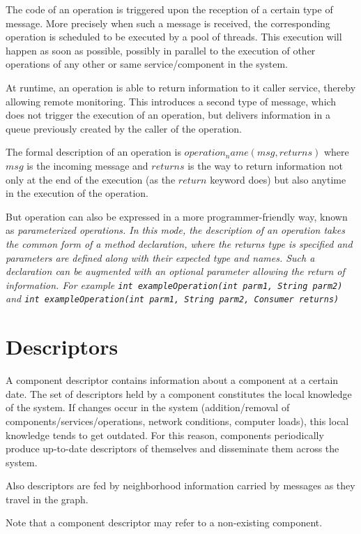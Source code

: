 \documentclass{article}
\begin{document}
The code of an operation is triggered upon the reception of a certain type of message. More precisely when such a message is received, the corresponding  operation is scheduled to be executed by a pool of threads. This execution will happen as soon as possible, possibly in parallel to the execution of other operations of any other or same service/component in the system.

At runtime, an operation is able to return information to it caller service, thereby allowing remote monitoring. This introduces a second type of message, which does not trigger the execution of an operation, but delivers information in a queue previously created by the caller of the operation.

The formal description of an operation is $operation_name(msg, returns)$ where $msg$ is the incoming message and $returns$ is the way to return information not only at the end of the execution (as the $return$ keyword does) but also anytime in the execution of the operation. 

But operation can also be expressed in a more programmer-friendly way, known as \em{parameterized} operations. In this mode, the description of an operation takes the common form of a method declaration, where the returns type is specified and parameters are defined along with their expected type and names. Such a declaration can be augmented with an optional parameter allowing the return of information. For example \texttt{int exampleOperation(int parm1, String parm2)} and \texttt{int exampleOperation(int parm1, String parm2, Consumer returns)}


\section{Descriptors}
A component descriptor contains information  about a component at a certain date. The set of descriptors held by a component constitutes the local knowledge of the system.
If changes occur in the system (addition/removal of components/services/operations, network conditions, computer loads), this local knowledge tends to get outdated. For this reason, components periodically produce up-to-date descriptors of themselves and disseminate them across the system.

Also descriptors are fed by neighborhood information carried by messages as they travel in the graph.

Note that a component descriptor may refer to a non-existing component.
\end{document}
